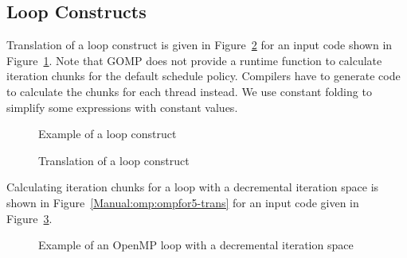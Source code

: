\clearpage
\subsection{Loop Constructs}
Translation of a loop construct is given in
Figure~\ref{Manual:omp:ompfor-trans} for an input code shown in
Figure~\ref{Manual:omp:ompfor}. 
Note that GOMP does not provide a runtime function to calculate iteration chunks for the default schedule policy. 
Compilers have to generate code to calculate the chunks for each thread instead. 
We use constant folding to simplify some expressions with constant values. 

\lstset{language=C,basicstyle=\scriptsize}
\begin{figure}[htbp]
{\indent
  {\mySmallFontSize
    \begin{latexonly}
    
    \end{latexonly}
    \begin{htmlonly}
    
    \end{htmlonly}
  }
}
\caption{Example of a loop construct}
\label{Manual:omp:ompfor}
\end{figure}

\begin{figure}[htbp]
{\indent
  {\mySmallFontSize
    \begin{latexonly}
    
    \end{latexonly}
    \begin{htmlonly}
    
    \end{htmlonly}
  }
}
\caption{Translation of a loop construct}
\label{Manual:omp:ompfor-trans}
\end{figure}

Calculating iteration chunks for a loop with a decremental iteration space is shown in 
Figure~\ref{Manual:omp:ompfor5-trans} for an input code given in
Figure~\ref{Manual:omp:ompfor5}. 

\lstset{language=C,basicstyle=\scriptsize}
\begin{figure}[htbp]
{\indent
  {\mySmallFontSize
    \begin{latexonly}
    
    \end{latexonly}
    \begin{htmlonly}
    
    \end{htmlonly}
  }
}
\caption{Example of an OpenMP loop with a decremental iteration space}
\label{Manual:omp:ompfor5}
\end{figure}

